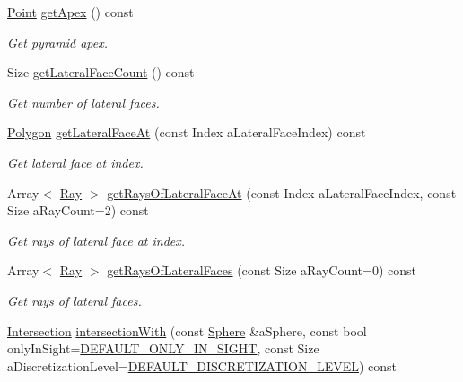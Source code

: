 \begin{DoxyCompactItemize}
\hyperlink{classostk_1_1math_1_1geom_1_1d3_1_1objects_1_1_point}{Point} \hyperlink{classostk_1_1math_1_1geom_1_1d3_1_1objects_1_1_pyramid_acbc557f7d8bbfe1fc3f59fdad16684a3}{get\+Apex} () const
\begin{DoxyCompactList}\small\item\em Get pyramid apex. \end{DoxyCompactList}\item 
Size \hyperlink{classostk_1_1math_1_1geom_1_1d3_1_1objects_1_1_pyramid_af853f40f9b9501c7fcad30337d646c4c}{get\+Lateral\+Face\+Count} () const
\begin{DoxyCompactList}\small\item\em Get number of lateral faces. \end{DoxyCompactList}\item 
\hyperlink{classostk_1_1math_1_1geom_1_1d3_1_1objects_1_1_polygon}{Polygon} \hyperlink{classostk_1_1math_1_1geom_1_1d3_1_1objects_1_1_pyramid_a5c29f2b5915fbcf7a200b49840805c86}{get\+Lateral\+Face\+At} (const Index a\+Lateral\+Face\+Index) const
\begin{DoxyCompactList}\small\item\em Get lateral face at index. \end{DoxyCompactList}\item 
Array$<$ \hyperlink{classostk_1_1math_1_1geom_1_1d3_1_1objects_1_1_ray}{Ray} $>$ \hyperlink{classostk_1_1math_1_1geom_1_1d3_1_1objects_1_1_pyramid_a798481e060dc0af1ed8ed57a75d8fa9b}{get\+Rays\+Of\+Lateral\+Face\+At} (const Index a\+Lateral\+Face\+Index, const Size a\+Ray\+Count=2) const
\begin{DoxyCompactList}\small\item\em Get rays of lateral face at index. \end{DoxyCompactList}\item 
Array$<$ \hyperlink{classostk_1_1math_1_1geom_1_1d3_1_1objects_1_1_ray}{Ray} $>$ \hyperlink{classostk_1_1math_1_1geom_1_1d3_1_1objects_1_1_pyramid_a7ead70ef5dff894a705f337dbc6cbff6}{get\+Rays\+Of\+Lateral\+Faces} (const Size a\+Ray\+Count=0) const
\begin{DoxyCompactList}\small\item\em Get rays of lateral faces. \end{DoxyCompactList}\item 
\hyperlink{classostk_1_1math_1_1geom_1_1d3_1_1_intersection}{Intersection} \hyperlink{classostk_1_1math_1_1geom_1_1d3_1_1objects_1_1_pyramid_a254b6d83bb83794852fe13317728ddf0}{intersection\+With} (const \hyperlink{classostk_1_1math_1_1geom_1_1d3_1_1objects_1_1_sphere}{Sphere} \&a\+Sphere, const bool only\+In\+Sight=\hyperlink{_sphere_8hpp_af424617f7c785f4835e2feba5a5640f2}{D\+E\+F\+A\+U\+L\+T\+\_\+\+O\+N\+L\+Y\+\_\+\+I\+N\+\_\+\+S\+I\+G\+HT}, const Size a\+Discretization\+Level=\hyperlink{_pyramid_8hpp_a3eb9931e85ba4c9718113211e549e91d}{D\+E\+F\+A\+U\+L\+T\+\_\+\+D\+I\+S\+C\+R\+E\+T\+I\+Z\+A\+T\+I\+O\+N\+\_\+\+L\+E\+V\+EL}) const

\end{DoxyCompactItemize}
